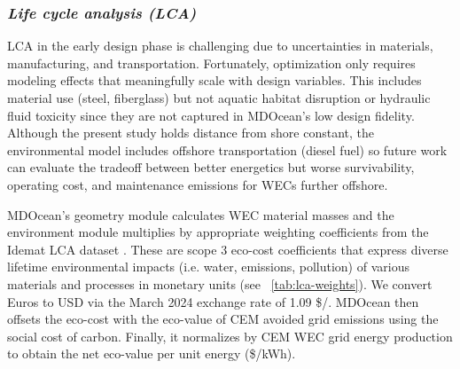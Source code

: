 \documentclass[10pt,twoside]{article}
\begin{document}
\subsubsection{\textit{Life cycle analysis (LCA)}}
LCA in the early design phase is challenging due to uncertainties in materials, manufacturing, and transportation.
Fortunately, optimization only requires modeling effects that meaningfully scale with design variables.
This includes material use (steel, fiberglass) but not aquatic habitat disruption or hydraulic fluid toxicity since they are not captured in MDOcean's low design fidelity.
Although the present study holds distance from shore constant, the environmental model includes offshore transportation (diesel fuel) so future work can evaluate the tradeoff between better energetics but worse survivability, operating cost, and maintenance emissions for WECs further offshore.

MDOcean's geometry module calculates WEC material masses and the environment module multiplies by appropriate weighting coefficients from the Idemat LCA dataset \cite{van_den_herik_idemat_2024}. These are scope 3 eco-cost coefficients \cite{vogtlander_lca-based_2010} that express diverse lifetime environmental impacts (i.e. water, emissions, pollution) of various materials and processes in monetary units (see \tableautorefname~\ref{tab:lca-weights}).
We convert Euros to USD via the March 2024 exchange rate of 1.09 \$/\texteuro.
MDOcean then offsets the eco-cost with the eco-value of CEM avoided grid emissions using the social cost of carbon. Finally, it normalizes by CEM WEC grid energy production to obtain the net eco-value per unit energy (\$/kWh).
\end{document}
